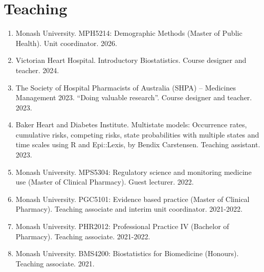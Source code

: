 \documentclass[11pt]{article}
\begin{document}
\section*{Teaching}
\begin{enumerate}
\item Monash University. MPH5214: Demographic Methods (Master of Public Health). Unit coordinator. 2026.
\item Victorian Heart Hospital. Introductory Biostatistics. Course designer and teacher. 2024.
\item The Society of Hospital Pharmacists of Australia (SHPA) – Medicines Management 2023. ``Doing valuable research''. Course designer and teacher. 2023.
\item Baker Heart and Diabetes Institute. Multistate models: Occurrence rates, cumulative risks, 
competing risks, state probabilities with multiple states and time scales using R and Epi::Lexis, by Bendix Carstensen. Teaching assistant. 2023.
\item Monash University. MPS5304: Regulatory science and monitoring medicine use (Master of Clinical Pharmacy). Guest lecturer. 2022.
\item Monash University. PGC5101: Evidence based practice (Master of Clinical Pharmacy). Teaching associate and interim unit coordinator. 2021-2022.
\item Monash University. PHR2012: Professional Practice IV (Bachelor of Pharmacy). Teaching associate. 2021-2022.
\item Monash University. BMS4200: Biostatistics for Biomedicine (Honours). Teaching associate. 2021.
\end{enumerate}
\end{document}

